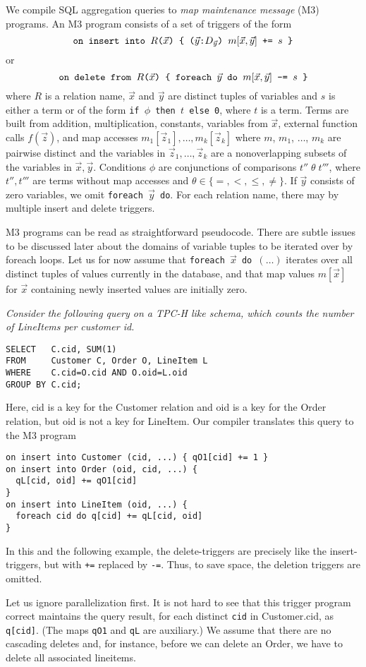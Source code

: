 We compile SQL aggregation queries to {\em map maintenance
message}\/ (M3) programs. An M3 program consists of a set of triggers of
the form
\[
\mbox{{\tt on insert into $R$($\vec{x}$) \{
($\vec{y}$:$D_{\vec{y}}$) $m[\vec{x}, \vec{y}]$ += $s$
\}}}
\]
or
\[
\mbox{{\tt on delete from $R$($\vec{x}$) \{
foreach $\vec{y}$ do $m[\vec{x}, \vec{y}]$ -= $s$
\}}}
\]
where $R$ is a relation name,
$\vec{x}$ and $\vec{y}$ are distinct tuples of variables and
$s$ is either a term or of the form
{\tt if $\phi$ then $t$ else 0}, where $t$ is a term.
Terms are built from addition, multiplication,
constants, variables from $\vec{x}$, external function calls $f(\vec{z})$,
and map accesses $m_1[\vec{z}_1], \dots, m_k[\vec{z}_k]$ where
$m$, $m_1$, $\dots$, $m_k$ are pairwise distinct
and the variables in $\vec{z}_1, \dots, \vec{z}_k$ are a nonoverlapping
subsets of the variables in $\vec{x}, \vec{y}$.
Conditions $\phi$ are conjunctions of comparisons $t'' \;\theta\; t'''$,
where $t'',t'''$ are terms without map accesses and
$\theta \in \{ =,<,\le,\neq \}$.
If $\vec{y}$ consists of zero variables, we omit
{\tt foreach $\vec{y}$ do}.
For each relation name, there may by multiple insert and delete triggers.

M3 programs can be read as straightforward pseudocode.
There are subtle issues to be discussed later about the domains of 
variable tuples
to be iterated over by foreach loops. Let us for now assume that
{\tt foreach $\vec{x}$ do $(\dots)$} iterates over all distinct tuples of
values currently in the
database, and that map values $m[\vec{x}]$ for $\vec{x}$ containing newly
inserted values are initially zero.


\begin{example}\em
\label{ex:TPCH-Q12}
Consider the following query on a TPC-H like schema,
which counts the number of LineItems per customer id.
\begin{verbatim}
SELECT   C.cid, SUM(1)
FROM     Customer C, Order O, LineItem L
WHERE    C.cid=O.cid AND O.oid=L.oid
GROUP BY C.cid;
\end{verbatim}
Here, cid is a key for the Customer relation and oid is a key for the
Order relation, but oid is not a key for LineItem.
Our compiler translates this query to the M3 program
\begin{verbatim}
on insert into Customer (cid, ...) { qO1[cid] += 1 }
on insert into Order (oid, cid, ...) {
  qL[cid, oid] += qO1[cid]
}
on insert into LineItem (oid, ...) {
  foreach cid do q[cid] += qL[cid, oid]
}
\end{verbatim}

In this and the following example, the delete-triggers are precisely
like the insert-triggers, but with {\tt +=} replaced by {\tt -=}.
Thus, to save space, the deletion triggers are omitted.

Let us ignore parallelization first.
It is not hard to see that this trigger program correct maintains the
query result, for each distinct {\tt cid} in Customer.cid, as {\tt q[cid]}.
(The maps {\tt qO1} and {\tt qL} are auxiliary.)
We assume that
there are no cascading deletes and, for instance, before we can delete an
Order, we have to delete all associated lineitems.
\punto
\end{example}


